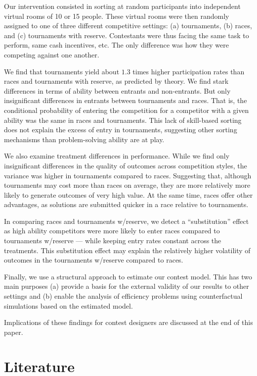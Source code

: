 \documentclass[11pt, titlepage]{article}
\begin{document}
Our intervention consisted in sorting at random participants into
independent virtual rooms of 10 or 15 people. These virtual rooms were
then randomly assigned to one of three different competitive settings:
(a) tournaments, (b) races, and (c) tournaments with reserve.
Contestants were thus facing the same task to perform, same cash
incentives, etc. The only difference was how they were competing against
one another.

We find that tournaments yield about \(1.3\) times higher participation
rates than races and tournaments with reserve, as predicted by theory.
We find stark differences in terms of ability between entrants and
non-entrants. But only insignificant differences in entrants between
tournaments and races. That is, the conditional probability of entering
the competition for a competitor with a given ability was the same in
races and tournaments. This lack of skill-based sorting does not explain
the excess of entry in tournaments, suggesting other sorting mechanisms
than problem-solving ability are at play.

We also examine treatment differences in performance. While we find only
insignificant differences in the quality of outcomes across competition
styles, the variance was higher in tournaments compared to races.
Suggesting that, although tournaments may cost more than races on
average, they are more relatively more likely to generate outcomes of
very high value. At the same time, races offer other advantages, as
solutions are submitted quicker in a race relative to tournaments.

In comparing races and tournaments w/reserve, we detect a
``substitution'' effect as high ability competitors were more likely to
enter races compared to tournaments w/reserve --- while keeping entry
rates constant across the treatments. This substitution effect may
explain the relatively higher volatility of outcomes in the tournaments
w/reserve compared to races.

Finally, we use a structural approach to estimate our contest model.
This has two main purposes (a) provide a basis for the external validity
of our results to other settings and (b) enable the analysis of
efficiency problems using counterfactual simulations based on the
estimated model.

Implications of these findings for contest designers are discussed at
the end of this paper.

\section{Literature}\label{literature}
\end{document}
